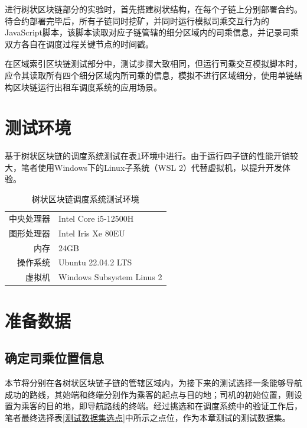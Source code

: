 进行树状区块链部分的实验时，首先搭建树状结构，在每个子链上分别部署合约。待合约部署完毕后，所有子链同时挖矿，并同时运行模拟司乘交互行为的JavaScript脚本，该脚本读取对应子链管辖的细分区域内的司乘信息，并记录司乘双方各自在调度过程关键节点的时间戳。

在区域索引区块链测试部分中，测试步骤大致相同，但运行司乘交互模拟脚本时，应令其读取所有四个细分区域内所司乘的信息，模拟不进行区域细分，使用单链结构区块链运行出租车调度系统的应用场景。

\section{测试环境}

基于树状区块链的调度系统测试在表\ref{树状区块链调度系统测试环境}环境中进行。由于运行四子链的性能开销较大，笔者使用Windows下的Linux子系统（WSL 2）代替虚拟机，以提升开发体验。

\begin{table}[htbp]
    \linespread{1.5}
    \centering
    \caption{树状区块链调度系统测试环境}\label{树状区块链调度系统测试环境}
    \begin{tabular}{r|l} \toprule
        中央处理器 & Intel Core i5-12500H      \\
        图形处理器 & Intel Iris Xe 80EU        \\
        内存    & 24GB                      \\
        操作系统  & Ubuntu 22.04.2 LTS        \\
        虚拟机   & Windows Subsystem Linus 2 \\
        \bottomrule
    \end{tabular}
\end{table}

\section{准备数据}

\subsection{确定司乘位置信息}

本节将分别在各树状区块链子链的管辖区域内，为接下来的测试选择一条能够导航成功的路线，其始端和终端分别作为乘客的起点与目的地；司机的初始位置，则设置为乘客的目的地，即导航路线的终端。经过挑选和在调度系统中的验证工作后，笔者最终选择表\ref{测试数据集选点}中所示之点位，作为本章测试的测试数据集。

